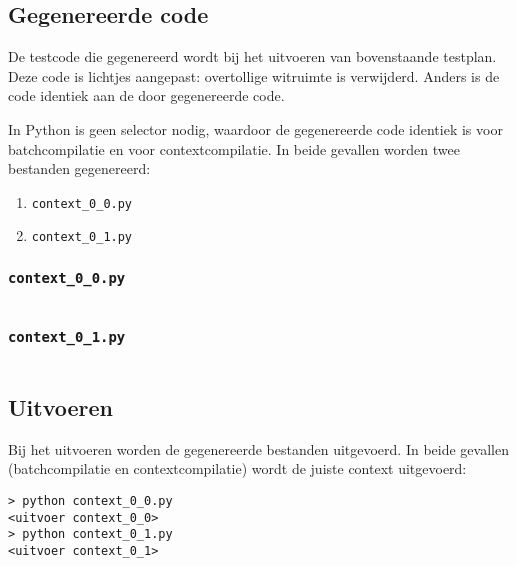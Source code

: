 \inputminted{python}{sources/echo/correct.py}

\subsection{Gegenereerde code}\label{subsec:echo-python-gegenereerde-code}

De testcode die gegenereerd wordt bij het uitvoeren van bovenstaande testplan.
Deze code is lichtjes aangepast: overtollige witruimte is verwijderd.
Anders is de code identiek aan de door \tested{} gegenereerde code.

In Python is geen selector nodig, waardoor de gegenereerde code identiek is voor batchcompilatie en voor contextcompilatie.
In beide gevallen worden twee bestanden gegenereerd:

\begin{enumerate}
    \item \texttt{context\_0\_0.py}
    \item \texttt{context\_0\_1.py}
\end{enumerate}

\subsubsection{\texttt{context\_0\_0.py}}

\inputminted{python}{sources/echo/context_0_0.py}

\subsubsection{\texttt{context\_0\_1.py}}

\inputminted{python}{sources/echo/context_0_1.py}

\subsection{Uitvoeren}\label{subsec:echo-python-uitvoeren}

Bij het uitvoeren worden de gegenereerde bestanden uitgevoerd.
In beide gevallen (batchcompilatie en contextcompilatie) wordt de juiste context uitgevoerd:

\begin{verbatim}
> python context_0_0.py
<uitvoer context_0_0>
> python context_0_1.py
<uitvoer context_0_1>
\end{verbatim}

